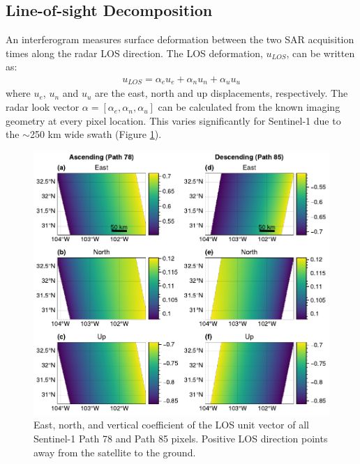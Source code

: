 

\subsection{Line-of-sight Decomposition}
\label{sec:ch4-insar-decomp}


An interferogram measures surface deformation between the two SAR acquisition times along the radar LOS direction. The LOS deformation, $u_{LOS}$, can be written as: 
\begin{align}
	u_{LOS}= \alpha_{e} u_{e} + \alpha_{n} u_{n} + \alpha_{u} u_{u}
\end{align}
where $u_{e}$, $u_{n}$ and $u_{u}$ are the east, north and up displacements, respectively. The radar look vector $\alpha = [\alpha_e, \alpha_n, \alpha_u]$ can be calculated from the known imaging geometry at every pixel location. This varies significantly for Sentinel-1 due to the $ \sim$250 km wide swath (Figure \ref{fig:los-map}). 


\begin{figure}
	\centering
	\includegraphics[width=.98\textwidth]{figures/chapter2-sar/figure_los_enu_coeffs-2col.pdf}
	\caption[East, north, and vertical coefficients of Sentinel-1 LOS vectors]{East, north, and vertical coefficient of the LOS unit vector of all Sentinel-1 Path 78 and Path 85 pixels. Positive LOS direction points away from the satellite to the ground.
	}
	\label{fig:los-map}
\end{figure}


